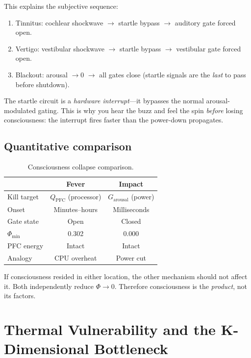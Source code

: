 \documentclass[aps,pre,twocolumn,superscriptaddress,floatfix]{revtex4-2}
\newcommand{\Zarousal}{G_{\text{arousal}}}
\newcommand{\QPFC}{Q_{\text{PFC}}}
\begin{document}
This explains the subjective sequence:
\begin{enumerate}
  \item Tinnitus: cochlear shockwave $\to$ startle bypass $\to$
    auditory gate forced open.
  \item Vertigo: vestibular shockwave $\to$ startle bypass $\to$
    vestibular gate forced open.
  \item Blackout: arousal $\to 0$ $\to$ all gates close
    (startle signals are the \emph{last} to pass before shutdown).
\end{enumerate}

The startle circuit is a \emph{hardware interrupt}---it
bypasses the normal arousal-modulated gating.
This is why you hear the buzz and feel the spin
\emph{before} losing consciousness: the interrupt fires
faster than the power-down propagates.

\subsection{Quantitative comparison}

\begin{table}[h]
\centering
\caption{Consciousness collapse comparison.}
\label{tab:two-kills}
\begin{tabular}{@{}lcc@{}}
\toprule
 & Fever & Impact \\
\midrule
Kill target & $\QPFC$ (processor) & $\Zarousal$ (power) \\
Onset & Minutes--hours & Milliseconds \\
Gate state & Open & Closed \\
$\Phi_{\min}$ & 0.302 & 0.000 \\
PFC energy & Intact & Intact \\
Analogy & CPU overheat & Power cut \\
\bottomrule
\end{tabular}
\end{table}

If consciousness resided in either location, the other
mechanism should not affect it.
Both independently reduce $\Phi\to 0$.
Therefore consciousness is the \emph{product}, not its factors.


\section{Thermal Vulnerability and the K-Dimensional Bottleneck}
\label{sec:thermal}
\end{document}
